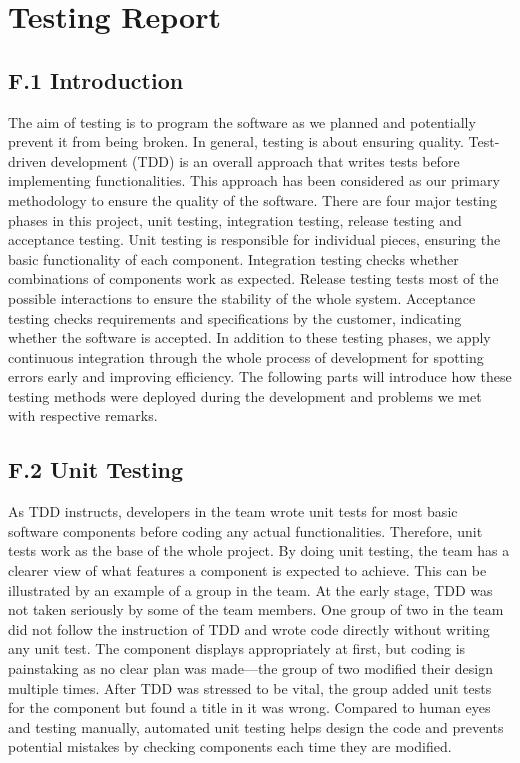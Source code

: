 \documentclass[
]{article}
\author{}
\date{}
\begin{document}
\tableofcontents

\hypertarget{header-n2}{%
\section{Testing Report}\label{header-n2}}

\hypertarget{header-n3}{%
\subsection{F.1 Introduction}\label{header-n3}}

The aim of testing is to program the software as we planned and
potentially prevent it from being broken. In general, testing is about
ensuring quality. Test-driven development (TDD) is an overall approach
that writes tests before implementing functionalities. This approach has
been considered as our primary methodology to ensure the quality of the
software. There are four major testing phases in this project, unit
testing, integration testing, release testing and acceptance testing.
Unit testing is responsible for individual pieces, ensuring the basic
functionality of each component. Integration testing checks whether
combinations of components work as expected. Release testing tests most
of the possible interactions to ensure the stability of the whole
system. Acceptance testing checks requirements and specifications by the
customer, indicating whether the software is accepted. In addition to
these testing phases, we apply continuous integration through the whole
process of development for spotting errors early and improving
efficiency. The following parts will introduce how these testing methods
were deployed during the development and problems we met with respective
remarks.

\hypertarget{header-n5}{%
\subsection{F.2 Unit Testing}\label{header-n5}}

As TDD instructs, developers in the team wrote unit tests for most basic
software components before coding any actual functionalities. Therefore,
unit tests work as the base of the whole project. By doing unit testing,
the team has a clearer view of what features a component is expected to
achieve. This can be illustrated by an example of a group in the team.
At the early stage, TDD was not taken seriously by some of the team
members. One group of two in the team did not follow the instruction of
TDD and wrote code directly without writing any unit test. The component
displays appropriately at first, but coding is painstaking as no clear
plan was made---the group of two modified their design multiple times.
After TDD was stressed to be vital, the group added unit tests for the
component but found a title in it was wrong. Compared to human eyes and
testing manually, automated unit testing helps design the code and
prevents potential mistakes by checking components each time they are
modified.
\end{document}
